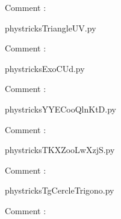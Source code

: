     Comment : 

    \clearpage
    


    \newcommand{\CaptionFigTriangleUV}{<+Type your caption here+>}
    \begin{center}
        
    \end{center}
    phystricksTriangleUV.py

    Comment : 

    \clearpage
    


    \newcommand{\CaptionFigExoCUd}{<+Type your caption here+>}
    \begin{center}
        
    \end{center}
    phystricksExoCUd.py

    Comment : 

    \clearpage
    


    \newcommand{\CaptionFigYYECooQlnKtD}{<+Type your caption here+>}
    \begin{center}
        
    \end{center}
    phystricksYYECooQlnKtD.py

    Comment : 

    \clearpage
    


    \newcommand{\CaptionFigTKXZooLwXzjS}{<+Type your caption here+>}
    \begin{center}
        
    \end{center}
    phystricksTKXZooLwXzjS.py

    Comment : 

    \clearpage
    


    \newcommand{\CaptionFigTgCercleTrigono}{<+Type your caption here+>}
    \begin{center}
        
    \end{center}
    phystricksTgCercleTrigono.py

    Comment : 

    \clearpage
    

